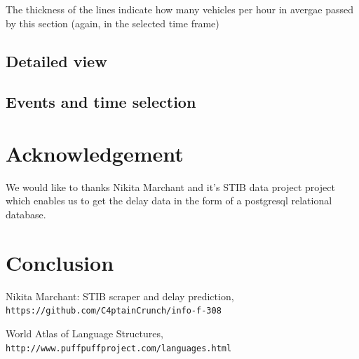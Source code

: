 \documentclass[12pt]{article}%
\begin{document}
The thickness of the lines indicate how many vehicles per hour in avergae passed by this section (again, in the selected time frame)


\subsection{Detailed view}






\subsection{Events and time selection}

\section{Acknowledgement}

We would like to thanks Nikita Marchant and it's STIB data project \cite{nikita} project which enables us to get the delay data in the form of a postgresql relational database.

\section{Conclusion}


 
\begin{thebibliography}{9}
 
Nikita Marchant: STIB scraper and delay prediction,
\\\texttt{https://github.com/C4ptainCrunch/info-f-308}

World Atlas of Language Structures,
\\\texttt{http://www.puffpuffproject.com/languages.html}



\end{thebibliography}
\end{document}
